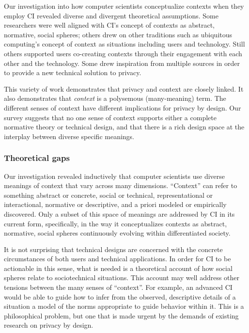 \documentclass[../thesis.tex]{subfiles}
\begin{document}
Our investigation into how computer scientists conceptualize contexts
when they employ CI revealed diverse and divergent theoretical
assumptions. Some researchers were well aligned with
CI's concept of contexts as abstract, normative, social
spheres; others drew on other traditions such as ubiquitous
computing's concept of context as situations including
users and technology. Still others supported users co-creating contexts
through their engagement with each other and the technology. Some drew
inspiration from multiple sources in order to provide a new technical
solution to privacy.

This variety of work demonstrates that privacy and context are closely
linked. It also demonstrates that \textit{context }is a polysemous
(many-meaning) term. The different senses of context have different
implications for privacy by design. Our survey suggests that no one
sense of context supports either a complete normative theory or
technical design, and that there is a rich design space at the
interplay between diverse specific meanings.

\subsubsection{Theoretical gaps}
\label{CI5.2.1}

Our investigation revealed inductively that computer scientists use
diverse meanings of context that vary across many dimensions.
``Context'' can refer to something
abstract or concrete, social or technical, representational or
interactional, normative or descriptive, and a priori modeled or
empirically discovered. Only a subset of this space of meanings are
addressed by CI in its current form, specifically, in the way it
conceptualizes contexts as abstract, normative, social spheres
continuously evolving within differentiated society.

It is not surprising that technical designs are concerned with the
concrete circumstances of both users and technical applications. In
order for CI to be actionable in this sense, what is needed is a
theoretical account of how social spheres relate to sociotechnical
situations. This account may well address other tensions between the
many senses of ``context''. For
example, an advanced CI would be able to guide how to infer from the
observed, descriptive details of a situation a model of the norms
appropriate to guide behavior within it. This is a philosophical
problem, but one that is made urgent by the demands of existing
research on privacy by design.
\end{document}
